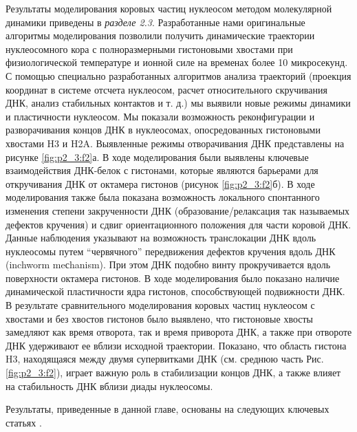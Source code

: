 Результаты  моделирования коровых частиц нуклеосом методом молекулярной динамики приведены в \textit{разделе 2.3}. Разработанные нами оригинальные алгоритмы моделирования позволили получить динамические траектории нуклеосомного кора с полноразмерными гистоновыми хвостами при физиологической температуре и ионной силе на временах более 10 микросекунд. 
 С помощью специально разработанных алгоритмов анализа траекторий (проекция координат в системе отсчета нуклеосом, расчет относительного скручивания ДНК, анализ стабильных контактов и т. д.) мы выявили новые режимы динамики и пластичности нуклеосом. Мы показали возможность реконфигурации и разворачивания концов ДНК в нуклеосомах, опосредованных гистоновыми хвостами H3 и H2A. Выявленные режимы отворачивания ДНК представлены на рисунке \ref{fig:p2_3:f2}а. В ходе моделирования были выявлены ключевые взаимодействия ДНК-белок с гистонами, которые являются барьерами для откручивания ДНК от октамера гистонов (рисунок \ref{fig:p2_3:f2}б). В ходе моделирования также была показана возможность локального спонтанного изменения степени закрученности ДНК (образование/релаксация так называемых дефектов кручения) и сдвиг ориентационного положения для части коровой ДНК. Данные наблюдения указывают на возможность транслокации ДНК вдоль нуклеосомы путем ``червячного'' передвижения дефектов кручения вдоль ДНК (inchworm meсhanism). При этом ДНК подобно винту прокручивается вдоль поверхности октамера гистонов. В ходе моделирования было показано наличие динамической пластичности ядра гистонов, способствующей подвижности ДНК. В результате сравнительного моделирования коровых частиц нуклеосом с хвостами и без хвостов гистонов было выявлено, что гистоновые хвосты замедляют как время отворота, так и время приворота ДНК, а также при отвороте ДНК удерживают ее вблизи исходной траектории. Показано, что область гистона H3, находящаяся между двумя супервитками ДНК (см. среднюю часть Рис. \ref{fig:p2_3:f2}), играет важную роль в стабилизации концов ДНК, а также влияет на стабильность ДНК вблизи диады нуклеосомы.

Результаты, приведенные в данной главе, основаны на следующих ключевых статьях  
 \cite{shaytan_coupling_2016,hada_histone_2019,bass_effect_2019,armeev_linking_2019,gribkova_investigation_2017,el_kennani_ms_histonedb_2017,shaytan_trajectories_2016,shaytan_coupling_2016,draizen_histonedb_2016,armeev_nucleosome_2016,shaytan_nucleosome_2015,armeev_conformational_2015,armeev_molecular_2015}.







